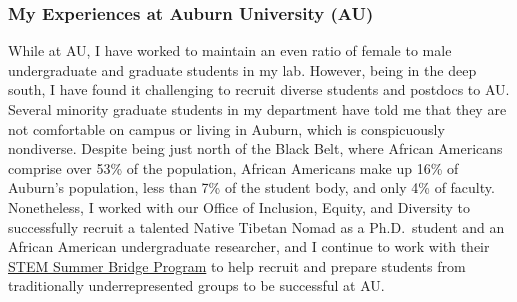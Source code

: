 \subsubsection*{My Experiences at Auburn University (AU)}
While at AU, I have worked to maintain an even ratio of female to male
undergraduate and graduate students in my lab.
However, being in the deep south, I have found it challenging to recruit
diverse students and postdocs to AU.
Several minority graduate students in my department have told me that they are
not comfortable on campus or living in Auburn, which is conspicuously
nondiverse.
Despite being just north of the Black Belt,
where African Americans comprise over 53\% of the population,
African Americans make up
16\% of Auburn's population, less than 7\% of the student body,
and only 4\% of faculty.
Nonetheless, I worked with
our Office of Inclusion, Equity, and Diversity to successfully recruit a
talented Native Tibetan Nomad as a Ph.D.\ student
and an African American undergraduate researcher,
and I continue to work with their
\href{https://www.auburn.edu/cosam/departments/diversity/summerbridge/index.htm}{STEM Summer Bridge Program}
to help recruit and prepare students from traditionally underrepresented groups
to be successful at AU.


